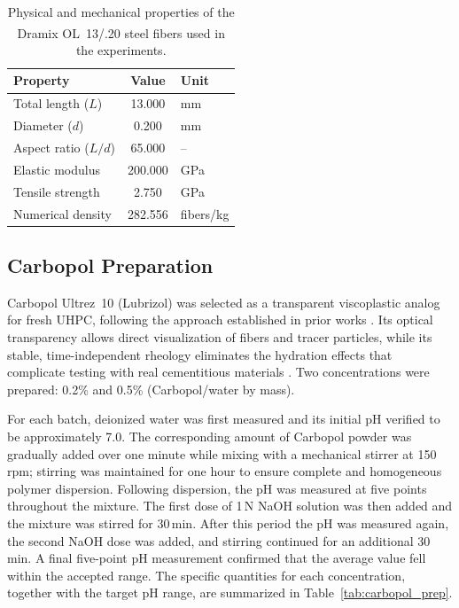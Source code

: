 \documentclass{iopjournal}
\begin{document}
\begin{table}[htb]
\centering
\caption{Physical and mechanical properties of the Dramix\textsuperscript{\textregistered}
OL~13/.20 steel fibers used in the experiments.}
\label{tab:fiber_props}
\begin{tabular}{lSl}
\toprule
\textbf{Property} & {\textbf{Value}} & \textbf{Unit} \\
\midrule
Total length ($L$)      & 13.000  & mm         \\
Diameter ($d$)          & 0.200   & mm         \\
Aspect ratio ($L/d$)    & 65.000  & --         \\
Elastic modulus         & 200.000 & GPa        \\
Tensile strength        & 2.750   & GPa        \\
Numerical density       & 282.556 & fibers/kg  \\
\bottomrule
\end{tabular}
\end{table}

\subsection{Carbopol Preparation}

Carbopol Ultrez~10 (Lubrizol) was selected as a transparent viscoplastic analog
for fresh UHPC, following the approach established in prior works
\cite{Dinkgreve2016,Tapia2025}. Its optical transparency allows direct visualization
of fibers and tracer particles, while its stable, time-independent rheology eliminates
the hydration effects that complicate testing with real cementitious materials
\cite{Auernhammer2020}. Two concentrations were prepared: 0.2\% and 0.5\%
(Carbopol/water by mass).

For each batch, deionized water was first measured and its initial pH verified to be
approximately 7.0. The corresponding amount of Carbopol powder was gradually added
over one minute while mixing with a mechanical stirrer at 150\,rpm; stirring was
maintained for one hour to ensure complete and homogeneous polymer dispersion.
Following dispersion, the pH was measured at five points throughout the mixture.
The first dose of 1\,N NaOH solution was then added and the mixture was stirred for
30\,min. After this period the pH was measured again, the second NaOH dose was
added, and stirring continued for an additional 30\,min. A final five-point pH
measurement confirmed that the average value fell within the accepted range. The
specific quantities for each concentration, together with the target pH range, are
summarized in Table~\ref{tab:carbopol_prep}.
\end{document}
